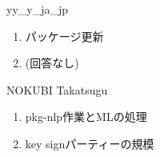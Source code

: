 \begin{prework}{ yy\_y\_ja\_jp }
  \begin{enumerate}
  \item パッケージ更新
  \item (回答なし)
  \end{enumerate}
\end{prework}

\begin{prework}{ NOKUBI Takatsugu }
  \begin{enumerate}
  \item pkg-nlp作業とMLの処理
  \item key signパーティーの規模
  \end{enumerate}
\end{prework}
